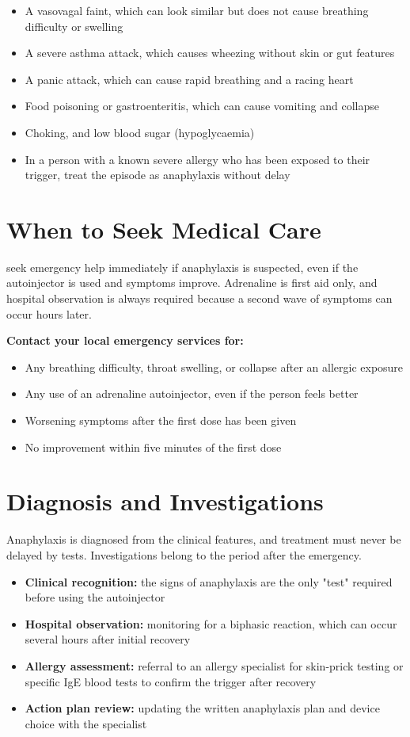 \begin{itemize}
    \item A vasovagal faint, which can look similar but does not cause breathing difficulty or swelling
    \item A severe asthma attack, which causes wheezing without skin or gut features
    \item A panic attack, which can cause rapid breathing and a racing heart
    \item Food poisoning or gastroenteritis, which can cause vomiting and collapse
    \item Choking, and low blood sugar (hypoglycaemia)
    \item In a person with a known severe allergy who has been exposed to their trigger, treat the episode as anaphylaxis without delay
\end{itemize}

\section*{When to Seek Medical Care}
seek emergency help immediately if anaphylaxis is suspected, even if the autoinjector is used and symptoms improve. Adrenaline is first aid only, and hospital observation is always required because a second wave of symptoms can occur hours later.

\textbf{Contact your local emergency services for:}
\begin{itemize}
    \item Any breathing difficulty, throat swelling, or collapse after an allergic exposure
    \item Any use of an adrenaline autoinjector, even if the person feels better
    \item Worsening symptoms after the first dose has been given
    \item No improvement within five minutes of the first dose
\end{itemize}

\section*{Diagnosis and Investigations}
Anaphylaxis is diagnosed from the clinical features, and treatment must never be delayed by tests. Investigations belong to the period after the emergency.

\begin{itemize}
    \item \textbf{Clinical recognition:} the signs of anaphylaxis are the only "test" required before using the autoinjector
    \item \textbf{Hospital observation:} monitoring for a biphasic reaction, which can occur several hours after initial recovery
    \item \textbf{Allergy assessment:} referral to an allergy specialist for skin-prick testing or specific IgE blood tests to confirm the trigger after recovery
    \item \textbf{Action plan review:} updating the written anaphylaxis plan and device choice with the specialist
\end{itemize}

